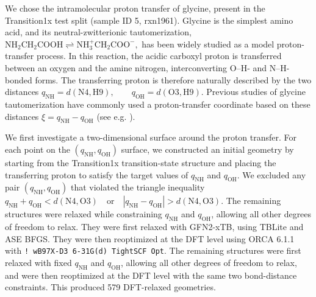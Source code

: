 \documentclass[pdflatex,sn-mathphys-num]{sn-jnl}%
\theoremstyle{thmstyleone}%
\theoremstyle{thmstyletwo}%
\theoremstyle{thmstylethree}%
\begin{document}
\begin{appendices}
We chose the intramolecular proton transfer of glycine, present in the Transition1x test split (sample ID 5, rxn1961). Glycine is the simplest amino acid, and its neutral-zwitterionic tautomerization,
\(
\mathrm{NH_2CH_2COOH \rightleftharpoons NH_3^+CH_2COO^-},
\)
has been widely studied as a model proton-transfer process. In this reaction, the acidic carboxyl proton is transferred between an oxygen and the amine nitrogen, interconverting O--H- and N--H-bonded forms. The transferring proton is therefore naturally described by the two distances
\(
q_{\mathrm{NH}} = d(\mathrm{N4},\mathrm{H9}), \qquad
q_{\mathrm{OH}} = d(\mathrm{O3},\mathrm{H9}).
\)
Previous studies of glycine tautomerization have commonly used a proton-transfer coordinate based on these distances
\(\xi = q_{\mathrm{NH}} - q_{\mathrm{OH}}\) (see e.g. \cite{zhang2024glycine}). 


We first investigate a two-dimensional surface around the proton transfer.
For each point on the 
\((q_{\mathrm{NH}}, q_{\mathrm{OH}})\)
surface, we constructed an initial geometry by starting from the Transition1x \citep{schreiner2022transition1x} transition-state structure and placing the transferring proton to satisfy the target values of \(q_{\mathrm{NH}}\) and \(q_{\mathrm{OH}}\). We excluded any pair \((q_{\mathrm{NH}}, q_{\mathrm{OH}})\) that violated the triangle inequality
\(
q_{\mathrm{NH}} + q_{\mathrm{OH}} < d(\mathrm{N4},\mathrm{O3})
\quad \mathrm{or} \quad
|q_{\mathrm{NH}} - q_{\mathrm{OH}}| > d(\mathrm{N4},\mathrm{O3}).
\)
The remaining structures were relaxed while constraining \(q_{\mathrm{NH}}\) and \(q_{\mathrm{OH}}\), allowing all other degrees of freedom to relax. 
They were first relaxed with GFN2-xTB, using TBLite and ASE BFGS.
They were then reoptimized at the DFT level using ORCA 6.1.1 with
\texttt{! wB97X-D3 6-31G(d) TightSCF Opt}.
The remaining structures were first relaxed with fixed \(q_{\mathrm{NH}}\) and \(q_{\mathrm{OH}}\), allowing all other degrees of freedom to relax, and were then reoptimized at the DFT level with the same two bond-distance constraints. This produced 579 DFT-relaxed geometries.


\end{appendices}
\end{document}
